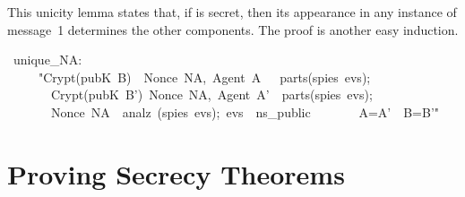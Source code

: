 This unicity lemma states that, if  is secret, then its appearance
in any instance of message~1 determines the other components.  The proof is
another easy induction.
\begin{isabelle}
\ unique_NA:\ \isanewline
\ \ \ \ \ "\isasymlbrakk Crypt(pubK\ B)\ \ \isasymlbrace Nonce\ NA,\ Agent\ A\ \isasymrbrace \ \isasymin \ parts(spies\ evs);\ \ \isanewline
\ \ \ \ \ \ \ Crypt(pubK\ B')\ \isasymlbrace Nonce\ NA,\ Agent\ A'\isasymrbrace \ \isasymin \ parts(spies\ evs);\ \ \isanewline
\ \ \ \ \ \ \ Nonce\ NA\ \isasymnotin \ analz\ (spies\ evs);\ evs\ \isasymin \ ns_public\isasymrbrakk \isanewline
\ \ \ \ \ \ \isasymLongrightarrow \ A=A'\ \isasymand \ B=B'"
\end{isabelle}


\section{Proving Secrecy Theorems}\label{sec:secrecy}

